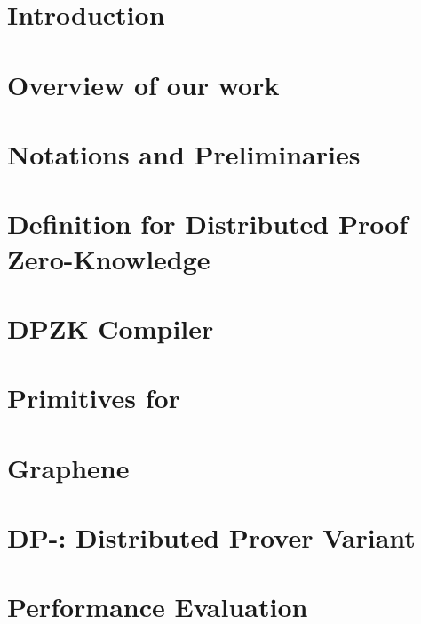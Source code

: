 \documentclass[USenglish,oneside,twocolumn]{article}
\begin{document}
\section{Introduction}
\label{sec:intro}

\section{Overview of our work}
\label{sec:overview}

\section{Notations and Preliminaries}
\label{sec:prelim}

\section{Definition for Distributed Proof Zero-Knowledge}
\label{sec:security model}

\section{DPZK Compiler}
\label{sec:compiler}

\section{Primitives for \name}
\label{sec:primitive}

\section{Graphene}
\label{sec:graphenec}

\section{DP-\name: Distributed Prover Variant}
\label{sec:DPgraphene}

\section{Performance Evaluation}
\label{sec:performancecompare}

\end{document}
